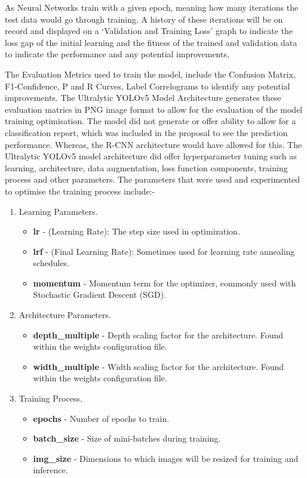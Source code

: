 \documentclass[12pt]{report} %
\begin{document}
        As Neural Networks train with a given epoch, meaning how many iterations the test data would go through training. A history of these iterations will be on record and displayed on a `Validation and Training Loss' graph to indicate the loss gap of the initial learning and the fitness of the trained and validation data to indicate the performance and any potential improvements,~\cite{panigrahi_deep_2018}

		The Evaluation Metrics used to train the model, include the Confusion Matrix, F1-Confidence, P and R Curves, Label Correlograms to identify any potential improvements. The Ultralytic YOLOv5 Model Architecture generates these evaluation matrics in PNG image format to allow for the evaluation of the model training optimisation. The model did not generate or offer ability to allow for a classification report, which was included in the proposal to see the prediction performance. Whereas, the R-CNN architecture would have allowed for this. The Ultralytic YOLOv5 model architecture did offer hyperparameter tuning such as learning, architecture, data augmentation, loss function components, training process and other parameters. The parameters that were used and experimented to optimise the training process include:-
		\begin{enumerate}
			\item Learning Parameters.
			\begin{itemize}
				\item \textbf{lr} - (Learning Rate): The step size used in optimization.
				\item \textbf{lrf} - (Final Learning Rate): Sometimes used for learning rate annealing schedules.
				\item \textbf{momentum} - Momentum term for the optimizer, commonly used with Stochastic Gradient Descent (SGD).
			\end{itemize}
			\item Architecture Parameters.
			\begin{itemize}
				\item \textbf{depth\_multiple} - Depth scaling factor for the architecture. Found within the weights configuration file.
				\item \textbf{width\_multiple} - Width scaling factor for the architecture. Found within the weights configuration file.
			\end{itemize}
			\item Training Process.
			\begin{itemize}
				\item \textbf{epochs} - Number of epochs to train.
				\item \textbf{batch\_size} - Size of mini-batches during training.
				\item \textbf{img\_size} - Dimensions to which images will be resized for training and inference.
			\end{itemize}
		\end{enumerate}
\end{document}
